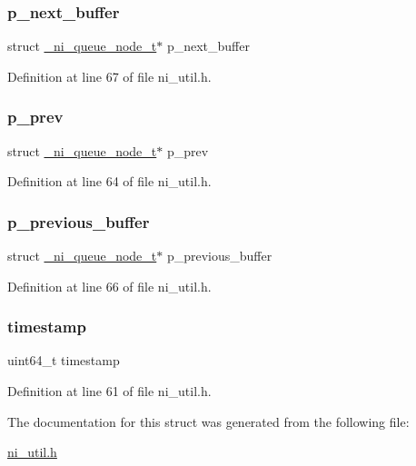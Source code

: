 \subsubsection{\texorpdfstring{p\_next\_buffer}{p\_next\_buffer}}
{\footnotesize\ttfamily struct \mbox{\hyperlink{struct__ni__queue__node__t}{\+\_\+ni\+\_\+queue\+\_\+node\+\_\+t}}$\ast$ p\+\_\+next\+\_\+buffer}



Definition at line 67 of file ni\+\_\+util.\+h.

\mbox{\label{struct__ni__queue__node__t_afe8e8271ea7d7114eab3e1c041f3a4f6}} 
\subsubsection{\texorpdfstring{p\_prev}{p\_prev}}
{\footnotesize\ttfamily struct \mbox{\hyperlink{struct__ni__queue__node__t}{\+\_\+ni\+\_\+queue\+\_\+node\+\_\+t}}$\ast$ p\+\_\+prev}



Definition at line 64 of file ni\+\_\+util.\+h.

\mbox{\label{struct__ni__queue__node__t_a589649d11ded883cfcaaca52da500130}} 
\subsubsection{\texorpdfstring{p\_previous\_buffer}{p\_previous\_buffer}}
{\footnotesize\ttfamily struct \mbox{\hyperlink{struct__ni__queue__node__t}{\+\_\+ni\+\_\+queue\+\_\+node\+\_\+t}}$\ast$ p\+\_\+previous\+\_\+buffer}



Definition at line 66 of file ni\+\_\+util.\+h.

\mbox{\label{struct__ni__queue__node__t_a465bef81f6478756e5443025b1f2ddfa}} 
\subsubsection{\texorpdfstring{timestamp}{timestamp}}
{\footnotesize\ttfamily uint64\+\_\+t timestamp}



Definition at line 61 of file ni\+\_\+util.\+h.



The documentation for this struct was generated from the following file\+:\begin{DoxyCompactItemize}
\item 
\mbox{\hyperlink{ni__util_8h}{ni\+\_\+util.\+h}}\end{DoxyCompactItemize}
